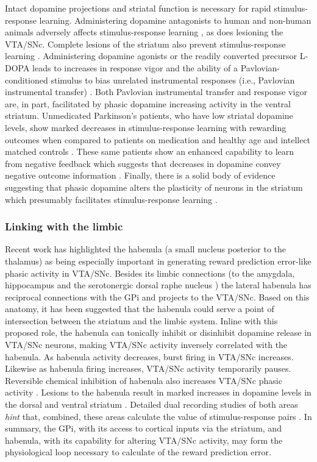 \documentclass[doc,12pt]{apa}        %
\begin{document}
Intact dopamine projections and striatal function is necessary for rapid stimulus-response learning.  Administering dopamine antagonists to human and non-human animals adversely affects stimulus-response learning \cite{Pizzagalli:2010p7205}, as does lesioning the VTA/SNc.  Complete lesions of the striatum also prevent stimulus-response learning \cite{Packard:2002p5074}.  Administering dopamine agonists or the readily converted precursor L-DOPA leads to increases in response vigor and the ability of a Pavlovian-conditioned stimulus to bias unrelated instrumental responses (i.e., Pavlovian instrumental transfer) \cite{Winterbauer:2007p6352}. Both Pavlovian instrumental transfer and response vigor are, in part, facilitated by phasic dopamine increasing activity in the ventral striatum.  Unmedicated Parkinson's patients, who have low striatal dopamine levels, show marked decreases in stimulus-response learning with rewarding outcomes when compared to patients on medication and healthy age and intellect matched controls \cite{Pizzagalli:2010p7205}.  These same patients show an enhanced capability to learn from negative feedback which suggests that decreases in dopamine convey negative outcome information \cite{Frank:2004p4709}.  Finally, there is a solid body of evidence suggesting that phasic dopamine alters the plasticity of neurons in the striatum which presumably facilitates stimulus-response learning \cite{Calabresi:2007p4284}.

\subsubsection{Linking with the limbic}
\label{subsub:limbic}
Recent work has highlighted the habenula (a small nucleus posterior to the thalamus) as being especially important in generating reward prediction error-like phasic activity in VTA/SNc.  Besides its limbic connections (to the amygdala, hippocampus and the serotonergic dorsal raphe nucleus \cite{Hikosaka:2008p4455}) the lateral habenula has reciprocal connections with the GPi and projects to the VTA/SNc.  Based on this anatomy, it has been suggested that the habenula could serve a point of intersection between the striatum and the limbic system.  Inline with this proposed role, the habenula can tonically inhibit or disinhibit dopamine release in VTA/SNc neurons, making VTA/SNc activity inversely correlated with the habenula.  As habenula activity decreases, burst firing in VTA/SNc increases.  Likewise as habenula firing increases, VTA/SNc activity temporarily pauses.  Reversible chemical inhibition of habenula also increases VTA/SNc phasic activity \cite{Hikosaka:2008p4455}.  Lesions to the habenula result in marked increases in dopamine levels in the dorsal and ventral striatum \cite{BrombergMartin:2010p7221}.  Detailed dual recording studies of both areas \emph{hint} that, combined, these areas calculate the value of stimulus-response pairs \cite{BrombergMartin:2010p7221}.  In summary, the GPi, with its access to cortical inputs via the striatum, and habenula, with its capability for altering VTA/SNc activity, may form the physiological loop necessary to calculate of the reward prediction error.
\end{document}
